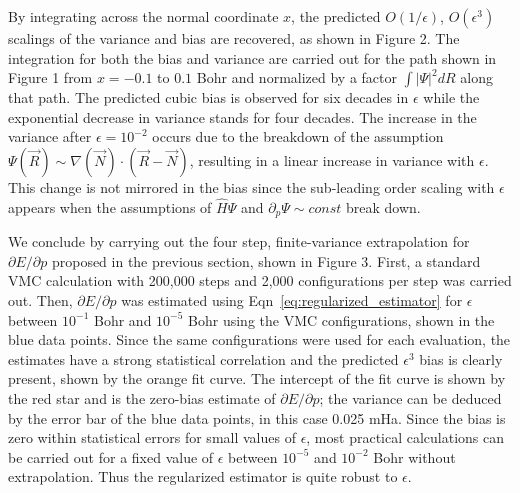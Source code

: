 \documentclass[twocolumn]{revtex4-1}
\begin{document}
By integrating across the normal coordinate $x$, the predicted $O(1/\epsilon)$, $O(\epsilon^3)$ scalings of the variance and bias are recovered, as shown in Figure 2.
The integration for both the bias and variance are carried out for the path shown in Figure 1 from $x = -0.1$ to $0.1$ Bohr and normalized by a factor $\int |\Psi|^2 dR$ along that path.
The predicted cubic bias is observed for six decades in $\epsilon$ while the exponential decrease in variance stands for four decades.
The increase in the variance after $\epsilon = 10^{-2}$ occurs due to the breakdown of the assumption $\Psi(\vec{R}) \sim \nabla(\vec{N}) \cdot (\vec{R}-\vec{N})$, resulting in a linear increase in variance with $\epsilon$.
This change is not mirrored in the bias since the sub-leading order scaling with $\epsilon$ appears when the assumptions of $\hat{H}\Psi$ and $\partial_p \Psi \sim const$ break down.

We conclude by carrying out the four step, finite-variance extrapolation for $\partial E/\partial p$ proposed in the previous section, shown in Figure 3.
First, a standard VMC calculation with 200,000 steps and 2,000 configurations per step was carried out.
Then, $\partial E/\partial p$ was estimated using Eqn~\ref{eq:regularized_estimator} for $\epsilon$ between $10^{-1}$ Bohr and $10^{-5}$ Bohr using the VMC configurations, shown in the blue data points.
Since the same configurations were used for each evaluation, the estimates have a strong statistical correlation and the predicted $\epsilon^3$ bias is clearly present, shown by the orange fit curve.
The intercept of the fit curve is shown by the red star and is the zero-bias estimate of $\partial E/\partial p$; the variance can be deduced by the error bar of the blue data points, in this case 0.025 mHa.
Since the bias is zero within statistical errors for small values of $\epsilon$, most practical calculations can be carried out for a fixed value of $\epsilon$ between $10^{-5}$ and $10^{-2}$ Bohr without extrapolation.
Thus the regularized estimator is quite robust to $\epsilon$.
\end{document}
